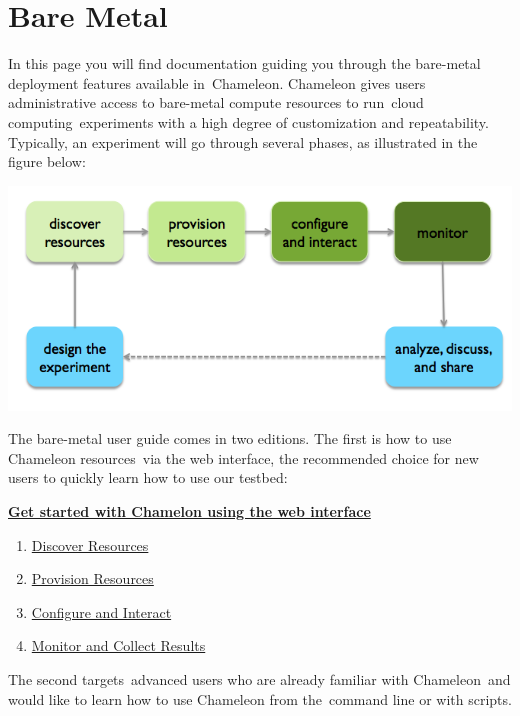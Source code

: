 \FILENAME

\section{Bare Metal}\label{C:cc-baremetal}

In this page you will find documentation guiding you through the
bare-metal deployment features available in~Chameleon. Chameleon gives
users administrative access to bare-metal compute resources to
run~{cloud computing~}experiments with a high degree of customization
and repeatability. Typically, an experiment will go through several
phases, as illustrated in the figure below:


\includegraphics[width=\columnwidth]{images/chameleon/baremetal.png}


The bare-metal user guide comes in two editions. The first is how to use
Chameleon resources~via the web interface, the recommended choice for
new users to quickly learn how to use our testbed:

\textbf{\href{https://www.chameleoncloud.org/discover-resources}{Get
started with Chamelon using the web interface}}

\begin{enumerate}
\item
  \href{https://www.chameleoncloud.org/discover-resources/}{Discover
  Resources}
\item
  \href{https://www.chameleoncloud.org/provision-resources/}{Provision
  Resources}~
\item
  \href{https://www.chameleoncloud.org/configure-and-interact/}{Configure
  and Interact}
\item
  \href{https://www.chameleoncloud.org/monitor-and-collect/}{Monitor and
  Collect Results}
\end{enumerate}

The second targets~advanced users who are already familiar with
Chameleon~and would like to learn how to use Chameleon from the~command
line or with scripts.

